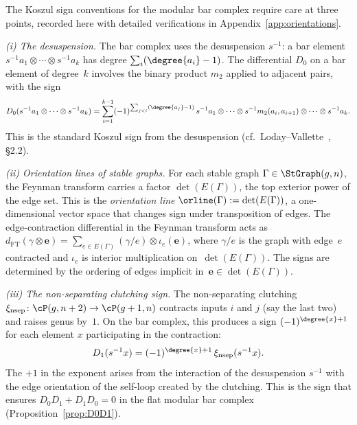 \begin{remark}
\label{rem:signs-orientations}
The Koszul sign conventions for the modular bar complex require
care at three points, recorded here with detailed verifications in
Appendix~\ref{app:orientations}.

\medskip\noindent
\emph{(i) The desuspension.}
The bar complex uses the desuspension $s^{-1}$: a bar element
$s^{-1} a_1 \otimes \cdots \otimes s^{-1} a_k$ has degree
$\sum_i (\degree{a_i} - 1)$. The differential $D_0$ on a
bar element of degree~$k$ involves the binary product $m_2$
applied to adjacent pairs, with the sign
\[
 D_0(s^{-1} a_1 \otimes \cdots \otimes s^{-1} a_k)
 = \sum_{i=1}^{k-1}
 (-1)^{\sum_{j < i}(\degree{a_j} - 1)}\,
 s^{-1} a_1 \otimes \cdots \otimes
 s^{-1} m_2(a_i, a_{i+1}) \otimes \cdots
 \otimes s^{-1} a_k.
\]
This is the standard Koszul sign from the desuspension
(cf.~Loday--Vallette~\cite{LV12}, \S2.2).

\medskip\noindent
\emph{(ii) Orientation lines of stable graphs.}
For each stable graph $\Gamma \in \StGraph(g,n)$, the
Feynman transform carries a factor $\det(E(\Gamma))$, the
top exterior power of the edge set. This is the
\emph{orientation line} $\orline(\Gamma) := \det(E(\Gamma))$,
a one-dimensional vector space that changes sign under
transposition of edges. The edge-contraction differential in
the Feynman transform acts as
$d_{\mathrm{FT}}(\gamma \otimes \mathbf{e})
= \sum_{e \in E(\Gamma)} (\gamma / e) \otimes
\iota_e(\mathbf{e})$,
where $\gamma / e$ is the graph with edge~$e$ contracted and
$\iota_e$ is interior multiplication on~$\det(E(\Gamma))$.
The signs are determined by the ordering of edges implicit
in~$\mathbf{e} \in \det(E(\Gamma))$.

\medskip\noindent
\emph{(iii) The non-separating clutching sign.}
The non-separating clutching
$\xi_{\mathrm{nsep}} \colon
\cP(g, n+2) \to \cP(g+1, n)$
contracts inputs $i$ and $j$ (say the last two) and raises
genus by~$1$. On the bar complex, this produces a sign
$(-1)^{\degree{x}+1}$ for each element $x$ participating
in the contraction:
\[
 D_1(s^{-1} x)
 = (-1)^{\degree{x}+1}\,
 \xi_{\mathrm{nsep}}(s^{-1} x).
\]
The $+1$ in the exponent arises from the interaction of the
desuspension $s^{-1}$ with the edge orientation of the
self-loop created by the clutching. This is the sign that
ensures $D_0 D_1 + D_1 D_0 = 0$ in the flat modular bar complex
(Proposition~\ref{prop:D0D1}).
\end{remark}


